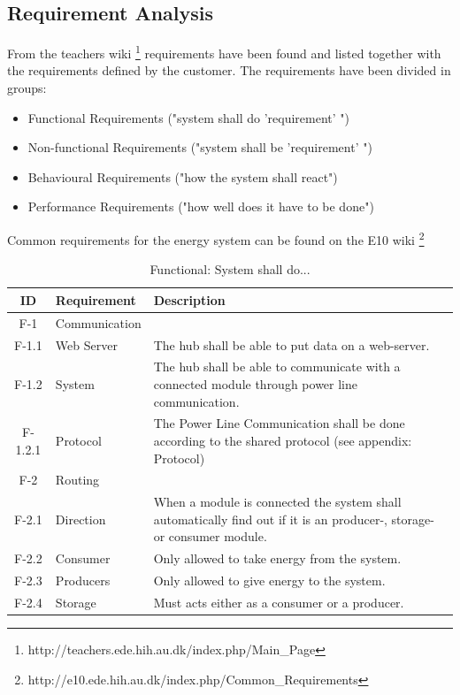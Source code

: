 \subsection{Requirement Analysis}
From the teachers wiki \footnote{http://teachers.ede.hih.au.dk/index.php/Main\_Page} requirements have been found and listed together with the requirements defined by the customer. The requirements have been divided in groups:
\begin{itemize}
	\item Functional Requirements ("system shall do 'requirement' ")
	\item Non-functional Requirements ("system shall be 'requirement' ")
	\item Behavioural Requirements ("how the system shall react")
	\item Performance Requirements ("how well does it have to be done")
\end{itemize}
Common requirements for the energy system can be found on the E10 wiki \footnote{http://e10.ede.hih.au.dk/index.php/Common\_Requirements}
\begin{table}[H]
	\begin{tabular} [b] {| c |  p{3cm} | p{10cm} |}
	\hline
	\textbf{ID} & \textbf{Requirement} & \textbf{Description} \\\hline
		F-1 & Communication 	&  \\ \hline
		F-1.1 & Web Server 		& The hub shall be able to put data on a web-server. \\ \hline
		F-1.2 & System 		& The hub shall be able to communicate with a connected module through power line communication. \\ \hline
		F-1.2.1 & Protocol 		& The Power Line Communication shall be done according to the shared protocol (see appendix: Protocol)\\ \hline
		F-2 & Routing 			&  \\ \hline
		F-2.1 & Direction		& When a module is connected the system shall automatically find out if it is an producer-, storage- or consumer module.\\ \hline
		F-2.2 & Consumer		& Only allowed to take energy from the system. \\ \hline
		F-2.3 & Producers 		& Only allowed to give energy to the system. \\ \hline
		F-2.4 & Storage 		& Must acts either as a consumer or a producer. \\ \hline
	\end{tabular}
	\caption{Functional: System shall do...}
\end{table}
